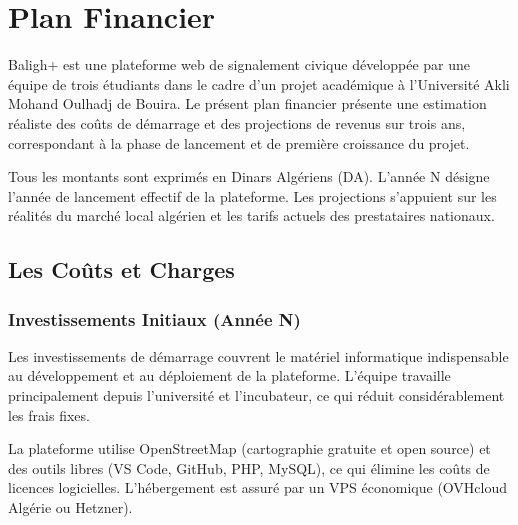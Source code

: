 \documentclass[12pt,a4paper]{report}
\begin{document}
\chapter{Plan Financier}

Baligh+ est une plateforme web de signalement civique développée par une équipe
de trois étudiants dans le cadre d'un projet académique à l'Université Akli
Mohand Oulhadj de Bouira. Le présent plan financier présente une estimation
réaliste des coûts de démarrage et des projections de revenus sur trois ans,
correspondant à la phase de lancement et de première croissance du projet.

\begin{notebox}
  Tous les montants sont exprimés en Dinars Algériens (DA). L'année N désigne
  l'année de lancement effectif de la plateforme. Les projections s'appuient
  sur les réalités du marché local algérien et les tarifs actuels des
  prestataires nationaux.
\end{notebox}

\section{Les Coûts et Charges}

\subsection{Investissements Initiaux (Année N)}

Les investissements de démarrage couvrent le matériel informatique
indispensable au développement et au déploiement de la plateforme. L'équipe
travaille principalement depuis l'université et l'incubateur, ce qui réduit
considérablement les frais fixes.

\begin{notebox}
  La plateforme utilise OpenStreetMap (cartographie gratuite et open source) et
  des outils libres (VS Code, GitHub, PHP, MySQL), ce qui élimine les coûts de
  licences logicielles. L'hébergement est assuré par un VPS économique
  (OVHcloud Algérie ou Hetzner).
\end{notebox}
\end{document}
